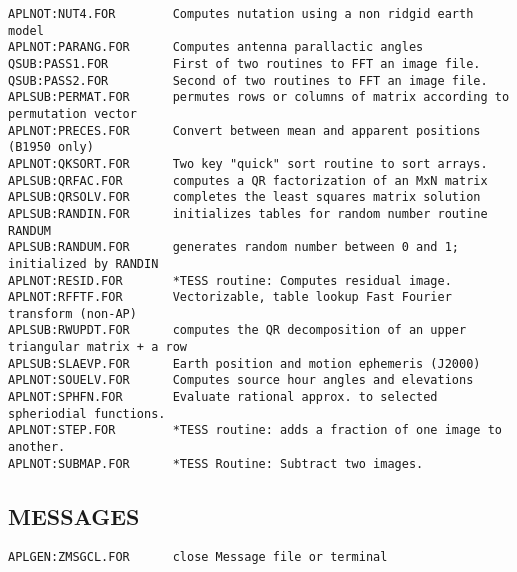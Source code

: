 \begin{verbatim}
APLNOT:NUT4.FOR        Computes nutation using a non ridgid earth model
APLNOT:PARANG.FOR      Computes antenna parallactic angles
QSUB:PASS1.FOR         First of two routines to FFT an image file.
QSUB:PASS2.FOR         Second of two routines to FFT an image file.
APLSUB:PERMAT.FOR      permutes rows or columns of matrix according to permutation vector
APLNOT:PRECES.FOR      Convert between mean and apparent positions (B1950 only)
APLNOT:QKSORT.FOR      Two key "quick" sort routine to sort arrays.
APLSUB:QRFAC.FOR       computes a QR factorization of an MxN matrix
APLSUB:QRSOLV.FOR      completes the least squares matrix solution
APLSUB:RANDIN.FOR      initializes tables for random number routine RANDUM
APLSUB:RANDUM.FOR      generates random number between 0 and 1; initialized by RANDIN
APLNOT:RESID.FOR       *TESS routine: Computes residual image.
APLNOT:RFFTF.FOR       Vectorizable, table lookup Fast Fourier transform (non-AP)
APLSUB:RWUPDT.FOR      computes the QR decomposition of an upper triangular matrix + a row
APLSUB:SLAEVP.FOR      Earth position and motion ephemeris (J2000)
APLNOT:SOUELV.FOR      Computes source hour angles and elevations
APLNOT:SPHFN.FOR       Evaluate rational approx. to selected spheriodial functions.
APLNOT:STEP.FOR        *TESS routine: adds a fraction of one image to another.
APLNOT:SUBMAP.FOR      *TESS Routine: Subtract two images.
\end{verbatim}
 
\subsection{MESSAGES}
\begin{verbatim}
APLGEN:ZMSGCL.FOR      close Message file or terminal
\end{verbatim}
 
